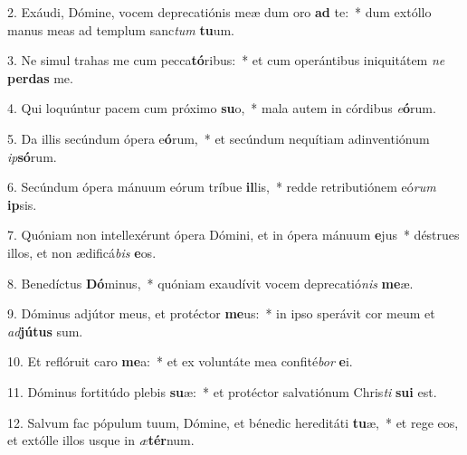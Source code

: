 2. Exáudi, Dómine, vocem deprecatiónis meæ dum oro \textbf{ad} te:~*  dum extóllo manus meas ad templum sanc\textit{tum} \textbf{tu}um.\

3. Ne simul trahas me cum pecca\textbf{tó}ribus:~*  et cum operántibus iniquitátem \textit{ne} \textbf{per}\textbf{das} me.\

4. Qui loquúntur pacem cum próximo \textbf{su}o,~*  mala autem in córdibus \textit{e}\textbf{ó}rum.\

5. Da illis secúndum ópera e\textbf{ó}rum,~*  et secúndum nequítiam adinventiónum \textit{ip}\textbf{só}rum.\

6. Secúndum ópera mánuum eórum tríbue \textbf{il}lis,~*  redde retributiónem eó\textit{rum} \textbf{ip}sis.\

7. Quóniam non intellexérunt ópera Dómini, et in ópera mánuum \textbf{e}jus~*  déstrues illos, et non ædificá\textit{bis} \textbf{e}os.\

8. Benedíctus \textbf{Dó}minus,~*  quóniam exaudívit vocem deprecatió\textit{nis} \textbf{me}æ.\

9. Dóminus adjútor meus, et protéctor \textbf{me}us:~*  in ipso sperávit cor meum et \textit{ad}\textbf{jú}\textbf{tus} sum.\

10. Et reflóruit caro \textbf{me}a:~*  et ex voluntáte mea confité\textit{bor} \textbf{e}i.\

11. Dóminus fortitúdo plebis \textbf{su}æ:~*  et protéctor salvatiónum Chris\textit{ti} \textbf{su}\textbf{i} est.\

12. Salvum fac pópulum tuum, Dómine, et bénedic hereditáti \textbf{tu}æ,~*  et rege eos, et extólle illos usque in \textit{æ}\textbf{tér}num.\

